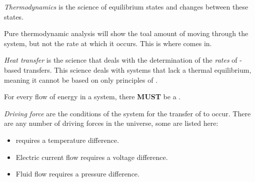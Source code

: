 \begin{definition}[Thermodynamics]\label{def:Thermodynamics}
  \emph{Thermodynamics} is the science of equilibrium states and changes between these states.
\end{definition}

Pure thermodynamic analysis will show the toal amount of  moving through the system, but not the rate at which it occurs.
This is where  comes in.

\begin{definition}\label{def:Heat_Transfer}
  \emph{Heat transfer} is the science that deals with the determination of the \textit{rates} of -based  transfers.
  This science deals with systems that lack a thermal equilibrium, meaning it cannot be based on only principles of .
\end{definition}

For every flow of energy in a system, there \textbf{MUST} be a .
\begin{definition}\label{def:Driving_Force}
  \emph{Driving force} are the conditions of the system for the transfer of  to occur.
  There are any number of driving forces in the universe, some are listed here:
  \begin{itemize}[noitemsep]
  \item {} requires a temperature difference.
  \item Electric current flow requires a voltage difference.
  \item Fluid flow requires a pressure difference.
  \end{itemize}
\end{definition}


